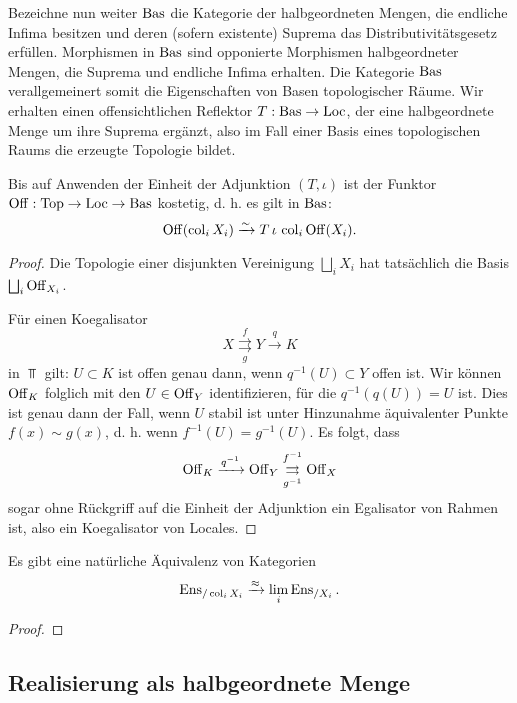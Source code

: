 Bezeichne nun weiter $\operatorname{Bas}$ die Kategorie der halbgeordneten Mengen,
die endliche Infima besitzen und deren (sofern existente) Suprema das
Distributivitätsgesetz erfüllen. Morphismen in $\operatorname{Bas}$ sind opponierte
Morphismen halbgeordneter Mengen, die Suprema und endliche Infima
erhalten. Die Kategorie $\operatorname{Bas}$ verallgemeinert somit die Eigenschaften
von Basen topologischer Räume. Wir erhalten einen offensichtlichen
Reflektor $T: \operatorname{Bas} \to \operatorname{Loc}$, der eine halbgeordnete Menge um ihre
Suprema ergänzt, also im Fall einer Basis eines topologischen Raums
die erzeugte Topologie bildet.
\begin{prop}
  Bis auf Anwenden der Einheit der Adjunktion $(T, \iota)$ ist der
  Funktor $\operatorname{Off}: \operatorname{Top} \to \operatorname{Loc} \to \operatorname{Bas}$ kostetig, d. h. es gilt in
  $\operatorname{Bas}$:
  \[ \operatorname{Off}(\operatorname{col}_i X_i) \xrightarrow[]{\sim} T \, \iota \, \operatorname{col}_i \operatorname{Off} (X_i) .\]
\end{prop}
\begin{proof}
  Die Topologie einer disjunkten Vereinigung $\bigsqcup_i X_i$ hat
  tatsächlich die Basis $\bigsqcup_i \operatorname{Off}_{X_i}$.
  
  Für einen Koegalisator
  \[ X \overset{f}{\underset{g}{\rightrightarrows}}
   Y \xrightarrow{q} K
  \]
  in $\Top$ gilt: $U \subset K$ ist offen genau dann, wenn
  $q^{-1}(U) \subset Y$ offen ist. Wir können $\operatorname{Off}_K$ folglich mit
  den $U \in \operatorname{Off}_Y$ identifizieren, für die $q^{-1}(q(U)) = U$
  ist. Dies ist genau dann der Fall, wenn $U$ stabil ist unter
  Hinzunahme äquivalenter Punkte $f(x) \sim g(x)$, d. h. wenn
  $f^{-1}(U) = g^{-1}(U)$. Es folgt, dass
  \[ \operatorname{Off}_K \xrightarrow{q^{-1}} \operatorname{Off}_Y
  \overset{f^{-1}}{\underset{g^{-1}}{\rightrightarrows}} \operatorname{Off}_X
  \]
  sogar ohne Rückgriff auf die Einheit der Adjunktion ein Egalisator
  von Rahmen ist, also ein Koegalisator von Locales.
\end{proof}
\begin{kor}
  Es gibt eine natürliche Äquivalenz von Kategorien
  \[ \operatorname{Ens}_{/\operatorname{col}_i X_i} \xrightarrow{\approx} \lim_i \operatorname{Ens}_{/X_i}. \]
\end{kor}
\begin{proof}
\end{proof}
\begin{theorem}
\end{theorem}

\subsection{Realisierung als halbgeordnete Menge}
\label{sec:real-poset}

